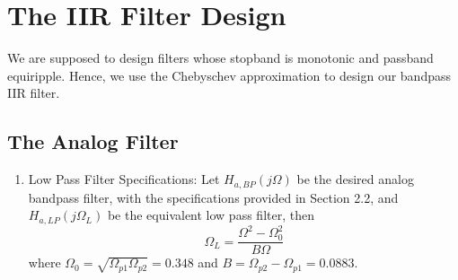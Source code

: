 \documentclass{article}
\begin{document}
\section{The IIR Filter Design}
We are supposed to design filters whose stopband is monotonic and passband equiripple.  
Hence, we use the Chebyschev approximation to design our bandpass IIR filter.
\subsection{The Analog Filter}
\begin{enumerate}

\item {Low Pass Filter Specifications:}  Let $H_{a, BP}(j\Omega)$ be the desired analog bandpass filter,  with the specifications provided in Section 2.2, and $H_{a,LP}(j\Omega_L)$ be the equivalent low pass filter, then
\begin{equation}
\Omega_L = \frac{\Omega^2 - \Omega_0^2}{B\Omega} \label{eq:freq_transform}
\end{equation}
where $\Omega_0 = \sqrt{\Omega_{p1}\Omega_{p2}} = 0.348$ and $B = \Omega_{p2} - \Omega_{p1} = 0.0883$.


\end{enumerate}
\end{document}
